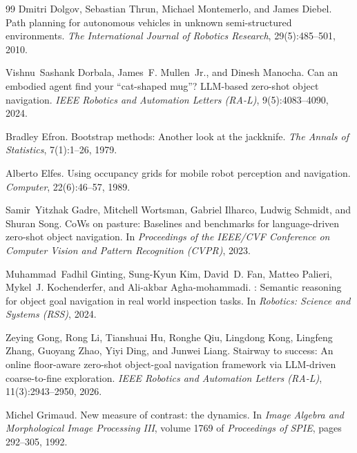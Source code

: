 \documentclass[10pt]{article}
\begin{document}
\begin{thebibliography}{99}
Dmitri Dolgov, Sebastian Thrun, Michael Montemerlo, and James Diebel.
\newblock Path planning for autonomous vehicles in unknown semi-structured environments.
\newblock \emph{The International Journal of Robotics Research}, 29(5):485--501, 2010.

Vishnu~Sashank Dorbala, James~F. Mullen~Jr., and Dinesh Manocha.
\newblock Can an embodied agent find your ``cat-shaped mug''? {LLM}-based zero-shot object navigation.
\newblock \emph{IEEE Robotics and Automation Letters (RA-L)}, 9(5):4083--4090, 2024.

Bradley Efron.
\newblock Bootstrap methods: Another look at the jackknife.
\newblock \emph{The Annals of Statistics}, 7(1):1--26, 1979.

Alberto Elfes.
\newblock Using occupancy grids for mobile robot perception and navigation.
\newblock \emph{Computer}, 22(6):46--57, 1989.

Samir~Yitzhak Gadre, Mitchell Wortsman, Gabriel Ilharco, Ludwig Schmidt, and Shuran Song.
\newblock CoWs on pasture: Baselines and benchmarks for language-driven zero-shot object navigation.
\newblock In \emph{Proceedings of the IEEE/CVF Conference on Computer Vision and Pattern Recognition (CVPR)}, 2023.

Muhammad~Fadhil Ginting, Sung-Kyun Kim, David~D. Fan, Matteo Palieri, Mykel~J. Kochenderfer, and Ali-akbar Agha-mohammadi.
: Semantic reasoning for object goal navigation in real world inspection tasks.
\newblock In \emph{Robotics: Science and Systems (RSS)}, 2024.

Zeying Gong, Rong Li, Tianshuai Hu, Ronghe Qiu, Lingdong Kong, Lingfeng Zhang, Guoyang Zhao, Yiyi Ding, and Junwei Liang.
\newblock Stairway to success: An online floor-aware zero-shot object-goal navigation framework via {LLM}-driven coarse-to-fine exploration.
\newblock \emph{IEEE Robotics and Automation Letters (RA-L)}, 11(3):2943--2950, 2026.

Michel Grimaud.
\newblock New measure of contrast: the dynamics.
\newblock In \emph{Image Algebra and Morphological Image Processing III}, volume 1769 of \emph{Proceedings of SPIE}, pages 292--305, 1992.


\end{thebibliography}
\end{document}

